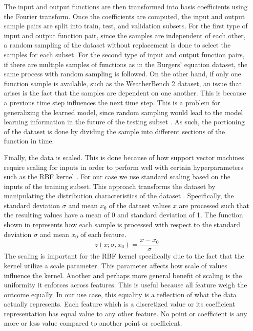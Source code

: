 The input and output functions are then transformed into basis coefficients using the Fourier transform. %
Once the coefficients are computed, the input and output sample pairs are split into train, test, and validation subsets. For the first type of input and output function pair, since the samples are independent of each other, a random sampling of the dataset without replacement is done to select the samples for each subset. For the second type of input and output function pairs, if there are multiple samples of functions as in the Burgers' equation dataset, the same process with random sampling is followed. On the other hand, if only one function sample is available, such as the WeatherBench 2 dataset, an issue that arises is the fact that the samples are dependent on one another. This is because a previous time step influences the next time step. This is a problem for generalizing the learned model, since random sampling would lead to the model learning information in the future of the testing subset \autocite{kapoorLeakageReproducibilityCrisis2023,kaufmanLeakageDataMining2012}. As such, the portioning of the dataset is done by dividing the sample into different sections of the function in time.

Finally, the data is scaled. This is done because of how support vector machines require scaling for inputs in order to perform well with certain hyperparameters such as the RBF kernel \autocite{ben-hurUsersGuideSupport2010}. For our case we use standard scaling based on the inputs of the training subset. This approach transforms the dataset by manipulating the distribution characteristics of the dataset \autocite{ahsanEffectDataScaling2021}. Specifically, the standard deviation \(\sigma \) and mean \(x_0\) of the dataset values \(x\) are processed such that the resulting values have a mean of 0 and standard deviation of 1. The function shown in  represents how each sample is processed with respect to the standard deviation \(\sigma \) and mean \(x_0\) of each feature.
\begin{equation}
  z(x;\sigma,x_0)=\frac{x-x_0}{\sigma} \label{eq:standard_scaler}
\end{equation}
The scaling is important for the RBF kernel specifically due to the fact that the kernel utilize a scale parameter. This parameter affects how scale of values influence the kernel. Another and perhaps more general benefit of scaling is the uniformity it enforces across features. This is useful because all feature weigh the outcome equally. In our use case, this equality is a reflection of what the data actually represents. Each feature which is a discretized value or its coefficient representation has equal value to any other feature. No point or coefficient is any more or less value compared to another point or coefficient.

